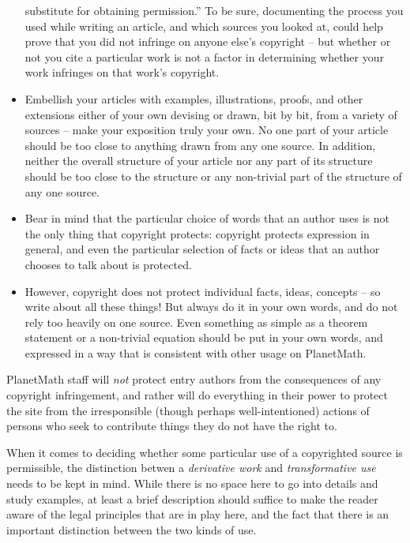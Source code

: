 \begin{itemize}
substitute for obtaining permission.'' To be sure, documenting the
process you used while writing an article, and which sources you
looked at, could help prove that you did not infringe on anyone
else's copyright -- but whether or not you cite a particular work is
not a factor in determining whether your work infringes on that
work's copyright.
\item Embellish your articles with examples, illustrations, proofs,
and other extensions either of your own devising or drawn, bit by
bit, from a variety of sources -- make your exposition truly your
own. No one part of your article should be too close to anything
drawn from any one source. In addition, neither the overall
structure of your article nor any part of its structure should be
too close to the structure or any non-trivial part of the structure of
any one source.
\item Bear in mind that the particular choice of words that an author
uses is not the only thing that copyright protects: copyright
protects expression in general, and even the particular selection of
facts or ideas that an author chooses to talk about is protected.
\item However, copyright does not protect individual facts, ideas,
concepts -- so write about all these things! But always do it in
your own words, and do not rely too heavily on one source. Even
something as simple as a theorem statement or a non-trivial equation
should be put in your own words, and expressed in a way that is
consistent with other usage on PlanetMath.
\end{itemize}

PlanetMath staff will \emph{not} protect entry authors from the
consequences of any copyright infringement, and rather will do
everything in their power to protect the site from the irresponsible
(though perhaps well-intentioned) actions of persons who seek to
contribute things they do not have the right to.

When it comes to deciding whether some particular use of a copyrighted
source is permissible, the distinction betwen a \emph{derivative work}
and \emph{transformative use} needs to be kept in mind. While there
is no space here to go into details and study examples, at least a
brief description should suffice to make the reader aware of the legal
principles that are in play here, and the fact that there is an
important distinction between the two kinds of use.

